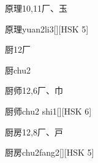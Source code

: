 \begin{Entry}{原理}{10,11}{⼚、⽟}
  \begin{Phonetics}{原理}{yuan2li3}[][HSK 5]
  \end{Phonetics}
\end{Entry}

\begin{Entry}{厨}{12}{⼚}
  \begin{Phonetics}{厨}{chu2}
  \end{Phonetics}
\end{Entry}

\begin{Entry}{厨师}{12,6}{⼚、⼱}
  \begin{Phonetics}{厨师}{chu2 shi1}[][HSK 6]
  \end{Phonetics}
\end{Entry}

\begin{Entry}{厨房}{12,8}{⼚、⼾}
  \begin{Phonetics}{厨房}{chu2fang2}[][HSK 5]
  \end{Phonetics}
\end{Entry}


